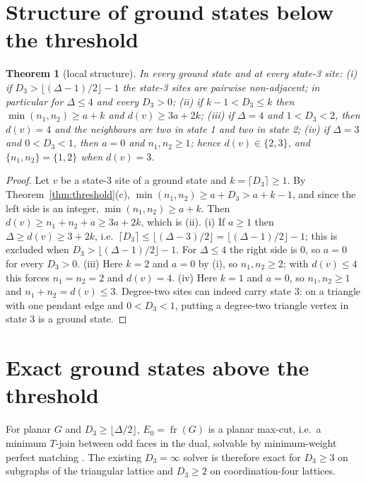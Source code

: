 \documentclass[aps,pre,twocolumn,superscriptaddress,showpacs]{revtex4-2}
\newtheorem{theorem}{Theorem}
\theoremstyle{definition}
\theoremstyle{remark}
\newcommand{\fr}{\operatorname{fr}}
\newcommand{\OPT}{E_0}
\begin{document}
\section{Structure of ground states below the threshold}
\label{sec:structure}
\begin{theorem}[local structure]\label{thm:local}
In every ground state and at every state-3 site:
(i) if $D_3>\lfloor(\Delta-1)/2\rfloor-1$ the state-3 sites are pairwise non-adjacent; in
particular for $\Delta\le4$ and every $D_3>0$;
(ii) if $k-1<D_3\le k$ then $\min(n_1,n_2)\ge a+k$ and $d(v)\ge 3a+2k$;
(iii) if $\Delta=4$ and $1<D_3<2$, then $d(v)=4$ and the neighbours are two in state 1 and two
in state 2;
(iv) if $\Delta=3$ and $0<D_3<1$, then $a=0$ and $n_1,n_2\ge1$; hence $d(v)\in\{2,3\}$, and
$\{n_1,n_2\}=\{1,2\}$ when $d(v)=3$.
\end{theorem}
\begin{proof}
Let $v$ be a state-3 site of a ground state and $k=\lceil D_3\rceil\ge1$. By
Theorem~\ref{thm:threshold}(c), $\min(n_1,n_2)\ge a+D_3>a+k-1$, and since the left side is an
integer, $\min(n_1,n_2)\ge a+k$. Then $d(v)\ge n_1+n_2+a\ge 3a+2k$, which is (ii).
(i) If $a\ge1$ then $\Delta\ge d(v)\ge3+2k$, i.e.\ $\lceil D_3\rceil\le\lfloor(\Delta-3)/2\rfloor
=\lfloor(\Delta-1)/2\rfloor-1$; this is excluded when $D_3>\lfloor(\Delta-1)/2\rfloor-1$. For
$\Delta\le4$ the right side is $0$, so $a=0$ for every $D_3>0$.
(iii) Here $k=2$ and $a=0$ by (i), so $n_1,n_2\ge2$; with $d(v)\le4$ this forces $n_1=n_2=2$ and
$d(v)=4$.
(iv) Here $k=1$ and $a=0$, so $n_1,n_2\ge1$ and $n_1+n_2=d(v)\le3$.
Degree-two sites can indeed carry state 3: on a triangle with one pendant edge and
$0<D_3<1$, putting a degree-two triangle vertex in state 3 is a ground state.
\end{proof}

\section{Exact ground states above the threshold}
\label{sec:exact}
For planar $G$ and $D_3\ge\lfloor\Delta/2\rfloor$, $\OPT=\fr(G)$ is a planar max-cut, i.e.\ a
minimum $T$-join between odd faces in the dual, solvable by minimum-weight perfect matching
\cite{Hadlock1975,Bieche1980,Barahona1982}. The existing $D_3=\infty$ solver is therefore exact for
$D_3\ge3$ on subgraphs of the triangular lattice and $D_3\ge2$ on coordination-four lattices.
\end{document}
